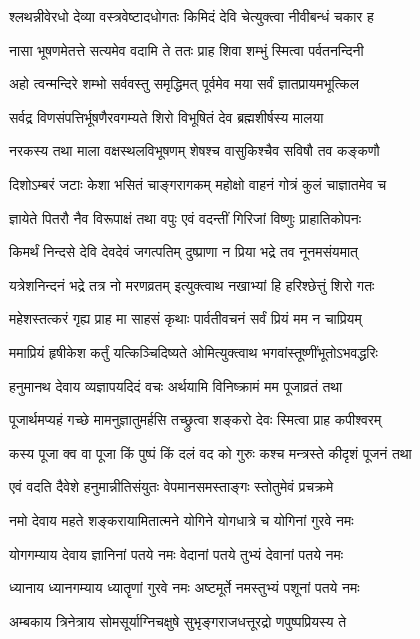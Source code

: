 \twolineshloka
{श्लथन्नीवेरधो देव्या वस्त्रवेष्टादधोगतः}
{किमिदं देवि चेत्युक्त्वा नीवीबन्धं चकार ह}%

\twolineshloka
{नासा भूषणमेतत्ते सत्यमेव वदामि ते}
{ततः प्राह शिवा शम्भुं स्मित्वा पर्वतनन्दिनी}%

\twolineshloka
{अहो त्वन्मन्दिरे शम्भो सर्ववस्तु समृद्धिमत्}
{पूर्वमेव मया सर्वं ज्ञातप्रायमभूत्किल}%

\twolineshloka
{सर्वद्र विणसंपत्तिर्भूषणैरवगम्यते}
{शिरो विभूषितं देव ब्रह्मशीर्षस्य मालया}%

\twolineshloka
{नरकस्य तथा माला वक्षस्थलविभूषणम्}
{शेषश्च वासुकिश्चैव सविषौ तव कङ्कणौ}%

\twolineshloka
{दिशोऽम्बरं जटाः केशा भसितं चाङ्गरागकम्}
{महोक्षो वाहनं गोत्रं कुलं चाज्ञातमेव च}%

\twolineshloka
{ज्ञायेते पितरौ नैव विरूपाक्षं तथा वपुः}
{एवं वदन्तीं गिरिजां विष्णुः प्राहातिकोपनः}%

\twolineshloka
{किमर्थं निन्दसे देवि देवदेवं जगत्पतिम्}
{दुष्प्राणा न प्रिया भद्रे तव नूनमसंयमात्}%

\twolineshloka
{यत्रेशनिन्दनं भद्रे तत्र नो मरणव्रतम्}
{इत्युक्त्वाथ नखाभ्यां हि हरिश्छेत्तुं शिरो गतः}%

\twolineshloka
{महेशस्तत्करं गृह्य प्राह मा साहसं कृथाः}
{पार्वतीवचनं सर्वं प्रियं मम न चाप्रियम्}%

\twolineshloka
{ममाप्रियं हृषीकेश कर्तुं यत्किञ्चिदिष्यते}
{ओमित्युक्त्वाथ भगवांस्तूष्णींभूतोऽभवद्धरिः}%

\twolineshloka
{हनुमानथ देवाय व्यज्ञापयदिदं वचः}
{अर्थयामि विनिष्क्रामं मम पूजाव्रतं तथा}%

\twolineshloka
{पूजार्थमप्यहं गच्छे मामनुज्ञातुमर्हसि}
{तच्छ्रुत्वा शङ्करो देवः स्मित्वा प्राह कपीश्वरम्}%

\twolineshloka
{कस्य पूजा क्व वा पूजा किं पुष्पं किं दलं वद}
{को गुरुः कश्च मन्त्रस्ते कीदृशं पूजनं तथा}%

\twolineshloka
{एवं वदति दैवेशे हनुमान्नीतिसंयुतः}
{वेपमानसमस्ताङ्गः स्तोतुमेवं प्रचक्रमे}%

\twolineshloka
{नमो देवाय महते शङ्करायामितात्मने}
{योगिने योगधात्रे च योगिनां गुरवे नमः}%

\twolineshloka
{योगगम्याय देवाय ज्ञानिनां पतये नमः}
{वेदानां पतये तुभ्यं देवानां पतये नमः}%

\twolineshloka
{ध्यानाय ध्यानगम्याय ध्यातॄणां गुरवे नमः}
{अष्टमूर्ते नमस्तुभ्यं पशूनां पतये नमः}%

\twolineshloka
{अम्बकाय त्रिनेत्राय सोमसूर्याग्निचक्षुषे}
{सुभृङ्गराजधत्तूरद्रो णपुष्पप्रियस्य ते}%

